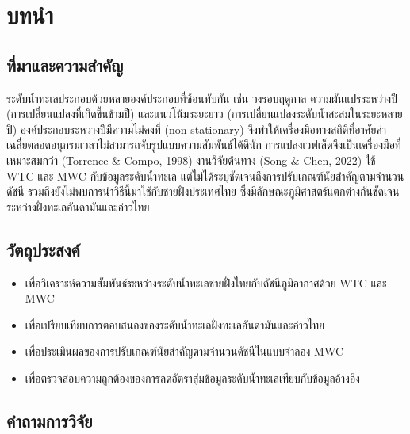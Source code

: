 \documentclass[a4paper,11pt]{article}
\begin{document}
\section{บทนำ}

\subsection{ที่มาและความสำคัญ}

ระดับน้ำทะเลประกอบด้วยหลายองค์ประกอบที่ซ้อนทับกัน เช่น วงรอบฤดูกาล ความผันแปรระหว่างปี (การเปลี่ยนแปลงที่เกิดขึ้นข้ามปี)
และแนวโน้มระยะยาว (การเปลี่ยนแปลงระดับน้ำสะสมในระยะหลายปี) องค์ประกอบระหว่างปีมีความไม่คงที่ (non-stationary)
จึงทำให้เครื่องมือทางสถิติที่อาศัยค่าเฉลี่ยตลอดอนุกรมเวลาไม่สามารถจับรูปแบบความสัมพันธ์ได้ดีนัก
การแปลงเวฟเล็ตจึงเป็นเครื่องมือที่เหมาะสมกว่า (Torrence \& Compo, 1998) งานวิจัยต้นทาง (Song \& Chen, 2022)
ใช้ WTC และ MWC กับข้อมูลระดับน้ำทะเล แต่ไม่ได้ระบุชัดเจนถึงการปรับเกณฑ์นัยสำคัญตามจำนวนดัชนี
รวมถึงยังไม่พบการนำวิธีนี้มาใช้กับชายฝั่งประเทศไทย ซึ่งมีลักษณะภูมิศาสตร์แตกต่างกันชัดเจนระหว่างฝั่งทะเลอันดามันและอ่าวไทย

\subsection{วัตถุประสงค์}

\begin{itemize}
  \item เพื่อวิเคราะห์ความสัมพันธ์ระหว่างระดับน้ำทะเลชายฝั่งไทยกับดัชนีภูมิอากาศด้วย WTC และ MWC
  \item เพื่อเปรียบเทียบการตอบสนองของระดับน้ำทะเลฝั่งทะเลอันดามันและอ่าวไทย
  \item เพื่อประเมินผลของการปรับเกณฑ์นัยสำคัญตามจำนวนดัชนีในแบบจำลอง MWC
  \item เพื่อตรวจสอบความถูกต้องของการลดอัตราสุ่มข้อมูลระดับน้ำทะเลเทียบกับข้อมูลอ้างอิง
\end{itemize}

\subsection{คำถามการวิจัย}
\end{document}
